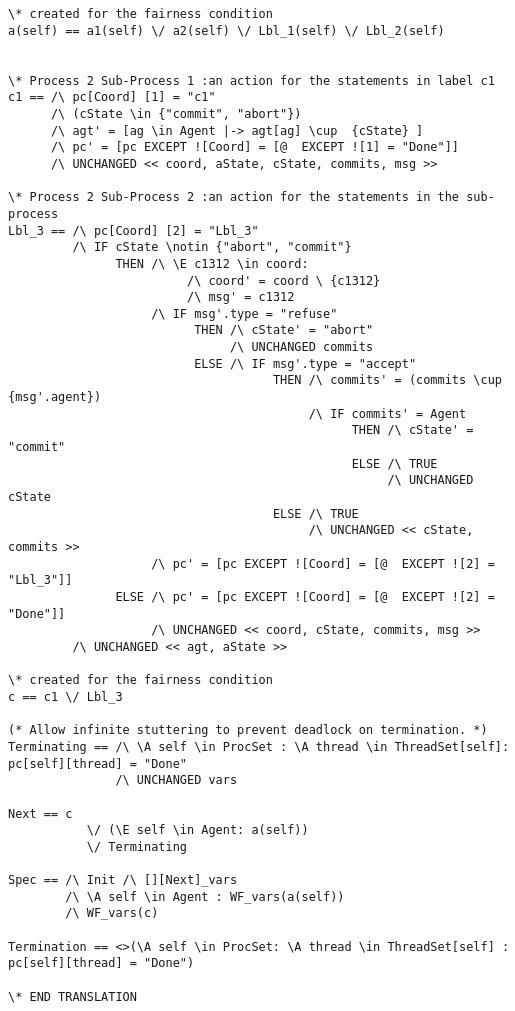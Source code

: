 \documentclass{thesul}
\begin{document}
\begin{lstlisting}[caption = TLA+ translation for Sub-Processes, frame = tlrb, firstnumber = 1]
\* created for the fairness condition
a(self) == a1(self) \/ a2(self) \/ Lbl_1(self) \/ Lbl_2(self)


\* Process 2 Sub-Process 1 :an action for the statements in label c1
c1 == /\ pc[Coord] [1] = "c1"
      /\ (cState \in {"commit", "abort"})
      /\ agt' = [ag \in Agent |-> agt[ag] \cup  {cState} ]
      /\ pc' = [pc EXCEPT ![Coord] = [@  EXCEPT ![1] = "Done"]]
      /\ UNCHANGED << coord, aState, cState, commits, msg >>

\* Process 2 Sub-Process 2 :an action for the statements in the sub-process
Lbl_3 == /\ pc[Coord] [2] = "Lbl_3"
         /\ IF cState \notin {"abort", "commit"}
               THEN /\ \E c1312 \in coord:
                         /\ coord' = coord \ {c1312}
                         /\ msg' = c1312
                    /\ IF msg'.type = "refuse"
                          THEN /\ cState' = "abort"
                               /\ UNCHANGED commits
                          ELSE /\ IF msg'.type = "accept"
                                     THEN /\ commits' = (commits \cup {msg'.agent})
                                          /\ IF commits' = Agent
                                                THEN /\ cState' = "commit"
                                                ELSE /\ TRUE
                                                     /\ UNCHANGED cState
                                     ELSE /\ TRUE
                                          /\ UNCHANGED << cState, commits >>
                    /\ pc' = [pc EXCEPT ![Coord] = [@  EXCEPT ![2] = "Lbl_3"]]
               ELSE /\ pc' = [pc EXCEPT ![Coord] = [@  EXCEPT ![2] = "Done"]]
                    /\ UNCHANGED << coord, cState, commits, msg >>
         /\ UNCHANGED << agt, aState >>

\* created for the fairness condition
c == c1 \/ Lbl_3

(* Allow infinite stuttering to prevent deadlock on termination. *)
Terminating == /\ \A self \in ProcSet : \A thread \in ThreadSet[self]: pc[self][thread] = "Done"
               /\ UNCHANGED vars

Next == c
           \/ (\E self \in Agent: a(self))
           \/ Terminating

Spec == /\ Init /\ [][Next]_vars
        /\ \A self \in Agent : WF_vars(a(self))
        /\ WF_vars(c)

Termination == <>(\A self \in ProcSet: \A thread \in ThreadSet[self] : pc[self][thread] = "Done")

\* END TRANSLATION 
\end{lstlisting}
\end{document}
